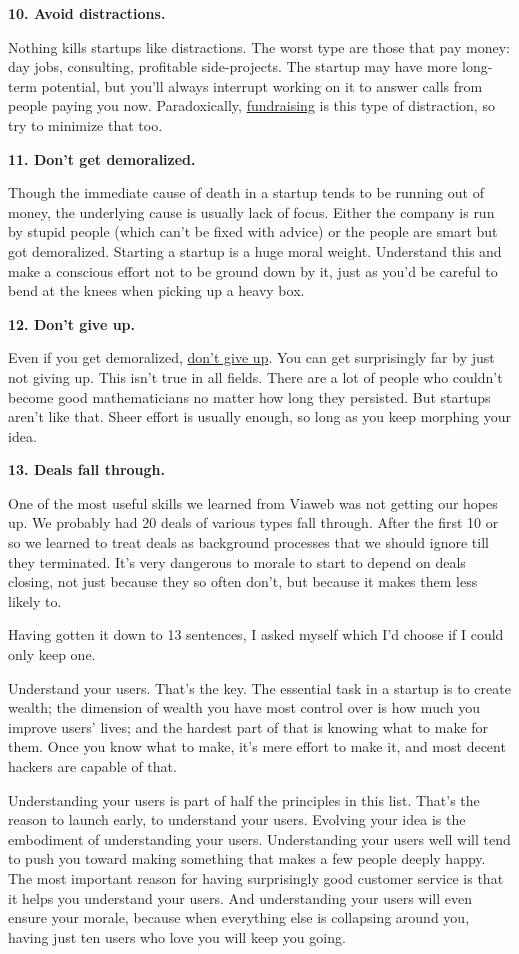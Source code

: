 \textbf{10. Avoid distractions.}

Nothing kills startups like distractions. The worst type are those that
pay money: day jobs, consulting, profitable side-projects. The startup
may have more long-term potential, but you'll always interrupt working
on it to answer calls from people paying you now. Paradoxically,
\href{fundraising.html}{fundraising} is this type of distraction, so try
to minimize that too.

\textbf{11. Don't get demoralized.}

Though the immediate cause of death in a startup tends to be running out
of money, the underlying cause is usually lack of focus. Either the
company is run by stupid people (which can't be fixed with advice) or
the people are smart but got demoralized. Starting a startup is a huge
moral weight. Understand this and make a conscious effort not to be
ground down by it, just as you'd be careful to bend at the knees when
picking up a heavy box.

\textbf{12. Don't give up.}

Even if you get demoralized, \href{die.html}{don't give up}. You can get
surprisingly far by just not giving up. This isn't true in all fields.
There are a lot of people who couldn't become good mathematicians no
matter how long they persisted. But startups aren't like that. Sheer
effort is usually enough, so long as you keep morphing your idea.

\textbf{13. Deals fall through.}

One of the most useful skills we learned from Viaweb was not getting our
hopes up. We probably had 20 deals of various types fall through. After
the first 10 or so we learned to treat deals as background processes
that we should ignore till they terminated. It's very dangerous to
morale to start to depend on deals closing, not just because they so
often don't, but because it makes them less likely to.

Having gotten it down to 13 sentences, I asked myself which I'd choose
if I could only keep one.

Understand your users. That's the key. The essential task in a startup
is to create wealth; the dimension of wealth you have most control over
is how much you improve users' lives; and the hardest part of that is
knowing what to make for them. Once you know what to make, it's mere
effort to make it, and most decent hackers are capable of that.

Understanding your users is part of half the principles in this list.
That's the reason to launch early, to understand your users. Evolving
your idea is the embodiment of understanding your users. Understanding
your users well will tend to push you toward making something that makes
a few people deeply happy. The most important reason for having
surprisingly good customer service is that it helps you understand your
users. And understanding your users will even ensure your morale,
because when everything else is collapsing around you, having just ten
users who love you will keep you going.


